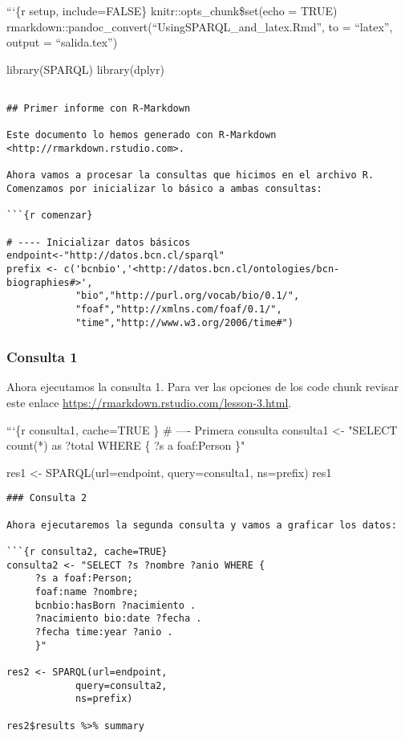 ```\{r setup, include=FALSE\} knitr::opts\_chunk\$set(echo = TRUE)
rmarkdown::pandoc\_convert(``UsingSPARQL\_and\_latex.Rmd'', to =
``latex'', output = ``salida.tex'')

library(SPARQL) library(dplyr)

\begin{verbatim}

## Primer informe con R-Markdown

Este documento lo hemos generado con R-Markdown <http://rmarkdown.rstudio.com>.

Ahora vamos a procesar la consultas que hicimos en el archivo R. Comenzamos por inicializar lo básico a ambas consultas:

```{r comenzar}

# ---- Inicializar datos básicos
endpoint<-"http://datos.bcn.cl/sparql"
prefix <- c('bcnbio','<http://datos.bcn.cl/ontologies/bcn-biographies#>',
            "bio","http://purl.org/vocab/bio/0.1/",
            "foaf","http://xmlns.com/foaf/0.1/",
            "time","http://www.w3.org/2006/time#")
\end{verbatim}

\hypertarget{consulta-1}{%
\subsubsection{Consulta 1}\label{consulta-1}}

Ahora ejecutamos la consulta 1. Para ver las opciones de los code chunk
revisar este enlace \url{https://rmarkdown.rstudio.com/lesson-3.html}.

```\{r consulta1, cache=TRUE \} \# ---- Primera consulta consulta1
\textless- "SELECT count(*) as ?total WHERE \{ ?s a foaf:Person \}"

res1 \textless- SPARQL(url=endpoint, query=consulta1, ns=prefix) res1

\begin{verbatim}
### Consulta 2

Ahora ejecutaremos la segunda consulta y vamos a graficar los datos:

```{r consulta2, cache=TRUE}
consulta2 <- "SELECT ?s ?nombre ?anio WHERE {
     ?s a foaf:Person;
     foaf:name ?nombre;
     bcnbio:hasBorn ?nacimiento .
     ?nacimiento bio:date ?fecha .
     ?fecha time:year ?anio .
     }"

res2 <- SPARQL(url=endpoint,
            query=consulta2,
            ns=prefix)

res2$results %>% summary
\end{verbatim}

